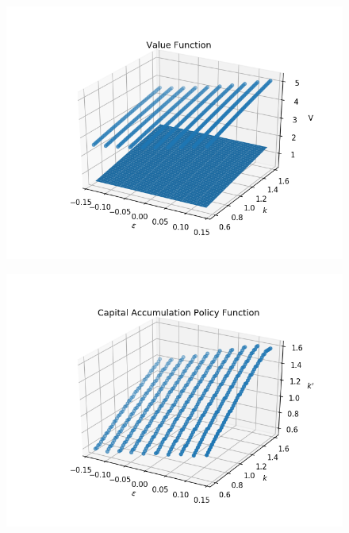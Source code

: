 \documentclass[]{article}
\begin{document}
\begin{figure}[H]
	\centering
	\includegraphics[scale=0.5]{Figures/Vf-3}
	\label{figure:1}
\end{figure}

\begin{figure}[H]
	\centering
	\includegraphics[scale=0.5]{Figures/Vf-4}
	\label{figure:1}
\end{figure}
\end{document}
